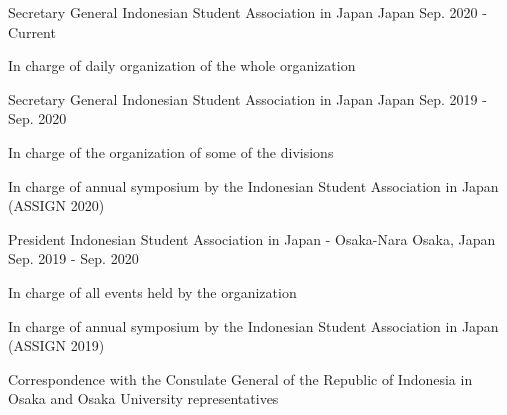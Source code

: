 

\begin{cventries}

  \cventry
  {Secretary General} %
  {Indonesian Student Association in Japan} %
  {Japan} %
  {Sep. 2020 - Current} %
  {
    \begin{cvitems} %
      \item {In charge of daily organization of the whole organization}
    \end{cvitems}
  }

  \cventry
  {Secretary General} %
  {Indonesian Student Association in Japan} %
  {Japan} %
  {Sep. 2019 - Sep. 2020} %
  {
    \begin{cvitems} %
      \item {In charge of the organization of some of the divisions}
      \item {In charge of annual symposium by the Indonesian Student Association in Japan (ASSIGN 2020)}
    \end{cvitems}
  }
 

  \cventry
  {President} %
  {Indonesian Student Association in Japan - Osaka-Nara} %
  {Osaka, Japan} %
  {Sep. 2019 - Sep. 2020} %
  {
    \begin{cvitems} %
      \item {In charge of all events held by the organization}
      \item {In charge of annual symposium by the Indonesian Student Association in Japan (ASSIGN 2019)}
      \item {Correspondence with the Consulate General of the Republic of Indonesia in Osaka and Osaka University representatives}
    \end{cvitems}
  }

\end{cventries}
